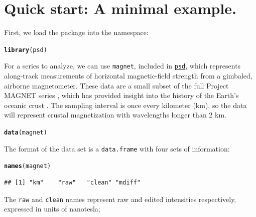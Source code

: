 \documentclass[10pt]{article}\usepackage[]{graphicx}\usepackage[]{color}
\makeatletter
\newcommand{\hlstd}[1]{\textcolor[rgb]{0.345,0.345,0.345}{#1}}%
\newcommand{\hlkwd}[1]{\textcolor[rgb]{0.737,0.353,0.396}{\textbf{#1}}}%
\newenvironment{kframe}{%
 \def\at@end@of@kframe{}%
 \ifinner\ifhmode%
  \def\at@end@of@kframe{\end{minipage}}%
  \begin{minipage}{\columnwidth}%
 \fi\fi%
 \def\FrameCommand##1{\hskip\@totalleftmargin \hskip-\fboxsep
 \colorbox{shadecolor}{##1}\hskip-\fboxsep
     \hskip-\linewidth \hskip-\@totalleftmargin \hskip\columnwidth}%
 \MakeFramed {\advance\hsize-\width
   \@totalleftmargin\z@ \linewidth\hsize
   \@setminipage}}%
 {\par\unskip\endMakeFramed%
 \at@end@of@kframe}
\newenvironment{knitrout}{}{} %
\newcommand{\Rcmd}[1]{\texttt{#1}}
\newcommand{\psd}[0]{\href{http://www.github.com/abarbour/psd/}{\color{blue}\Rcmd{psd}}}
\makeatother
\begin{document}
\section{Quick start: A minimal example.}
First, we load the package into the namespace:
\begin{knitrout}
\color{fgcolor}\begin{kframe}
\begin{alltt}
\hlkwd{library}\hlstd{(psd)}
\end{alltt}


{\ttfamily\noindent\itshape\color{messagecolor}{\#\# Loading required package: fftw\\\#\# Loaded psd (0.5.0) -- Adaptive multitaper spectrum estimation}}\end{kframe}
\end{knitrout}
For a series to analyze, we can use \Rcmd{magnet}, included in \psd{},
which represents along-track measurements
of horizontal magnetic-field strength from a gimbaled, airborne magnetometer.
These data are a small subset of the full Project MAGNET series \citep{coleman1992},
which has provided insight into
the history of the Earth's oceanic crust 
\citep{parker1997, obrien1999, korte2002}.
The sampling interval is
once every kilometer (km), so the data will represent
crustal magnetization with wavelengths longer than 2 km.
\begin{knitrout}
\color{fgcolor}\begin{kframe}
\begin{alltt}
\hlkwd{data}\hlstd{(magnet)}
\end{alltt}
\end{kframe}
\end{knitrout}
The format of the data set is a \Rcmd{data.frame} with four
sets of information:
\begin{knitrout}
\color{fgcolor}\begin{kframe}
\begin{alltt}
\hlkwd{names}\hlstd{(magnet)}
\end{alltt}
\begin{verbatim}
## [1] "km"    "raw"   "clean" "mdiff"
\end{verbatim}
\end{kframe}
\end{knitrout}
The \Rcmd{raw} and \Rcmd{clean} names represent raw
and edited intensities respectively, expressed in units of nanotesla; 
\end{document}
